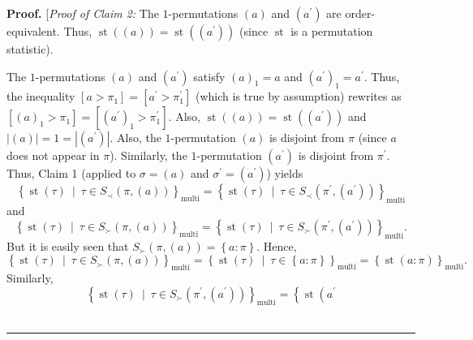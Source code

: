 \documentclass[numbers=enddot,12pt,final,onecolumn,notitlepage]{scrartcl}%
\theoremstyle{definition}
\newenvironment{proof}[1][Proof]{\noindent\textbf{#1.} }{\ \rule{0.5em}{0.5em}}
\newenvironment{verlong}{}{}
\begin{document}
\begin{verlong}
\begin{proof}
[\textit{Proof of Claim 2:} The $1$-permutations $\left(  a\right)  $ and
$\left(  a^{\prime}\right)  $ are order-equivalent. Thus, $\operatorname*{st}%
\left(  \left(  a\right)  \right)  =\operatorname*{st}\left(  \left(
a^{\prime}\right)  \right)  $ (since $\operatorname*{st}$ is a permutation statistic).

The $1$-permutations $\left(  a\right)  $ and $\left(  a^{\prime}\right)  $
satisfy $\left(  a\right)  _{1}=a$ and $\left(  a^{\prime}\right)
_{1}=a^{\prime}$. Thus, the inequality $\left[  a>\pi_{1}\right]  =\left[
a^{\prime}>\pi_{1}^{\prime}\right]  $ (which is true by assumption) rewrites
as $\left[  \left(  a\right)  _{1}>\pi_{1}\right]  =\left[  \left(  a^{\prime
}\right)  _{1}>\pi_{1}^{\prime}\right]  $. Also, $\operatorname*{st}\left(
\left(  a\right)  \right)  =\operatorname*{st}\left(  \left(  a^{\prime
}\right)  \right)  $ and $\left\vert \left(  a\right)  \right\vert
=1=\left\vert \left(  a^{\prime}\right)  \right\vert $. Also, the
$1$-permutation $\left(  a\right)  $ is disjoint from $\pi$ (since $a$ does
not appear in $\pi$). Similarly, the $1$-permutation $\left(  a^{\prime
}\right)  $ is disjoint from $\pi^{\prime}$. Thus, Claim 1 (applied to
$\sigma=\left(  a\right)  $ and $\sigma^{\prime}=\left(  a^{\prime}\right)  $)
yields
\[
\left\{  \operatorname*{st}\left(  \tau\right)  \ \mid\ \tau\in S_{\prec
}\left(  \pi,\left(  a\right)  \right)  \right\}  _{\operatorname*{multi}%
}=\left\{  \operatorname*{st}\left(  \tau\right)  \ \mid\ \tau\in S_{\prec
}\left(  \pi^{\prime},\left(  a^{\prime}\right)  \right)  \right\}
_{\operatorname*{multi}}%
\]
and%
\[
\left\{  \operatorname*{st}\left(  \tau\right)  \ \mid\ \tau\in S_{\succ
}\left(  \pi,\left(  a\right)  \right)  \right\}  _{\operatorname*{multi}%
}=\left\{  \operatorname*{st}\left(  \tau\right)  \ \mid\ \tau\in S_{\succ
}\left(  \pi^{\prime},\left(  a^{\prime}\right)  \right)  \right\}
_{\operatorname*{multi}}.
\]
But it is easily seen that $S_{\succ}\left(  \pi,\left(  a\right)  \right)
=\left\{  a:\pi\right\}  $. Hence,%
\[
\left\{  \operatorname*{st}\left(  \tau\right)  \ \mid\ \tau\in S_{\succ
}\left(  \pi,\left(  a\right)  \right)  \right\}  _{\operatorname*{multi}%
}=\left\{  \operatorname*{st}\left(  \tau\right)  \ \mid\ \tau\in\left\{
a:\pi\right\}  \right\}  _{\operatorname*{multi}}=\left\{  \operatorname*{st}%
\left(  a:\pi\right)  \right\}  _{\operatorname*{multi}}.
\]
Similarly,%
\[
\left\{  \operatorname*{st}\left(  \tau\right)  \ \mid\ \tau\in S_{\succ
}\left(  \pi^{\prime},\left(  a^{\prime}\right)  \right)  \right\}
_{\operatorname*{multi}}=\left\{  \operatorname*{st}\left(  a^{\prime}%
\]
\end{proof}
\end{verlong}
\end{document}

